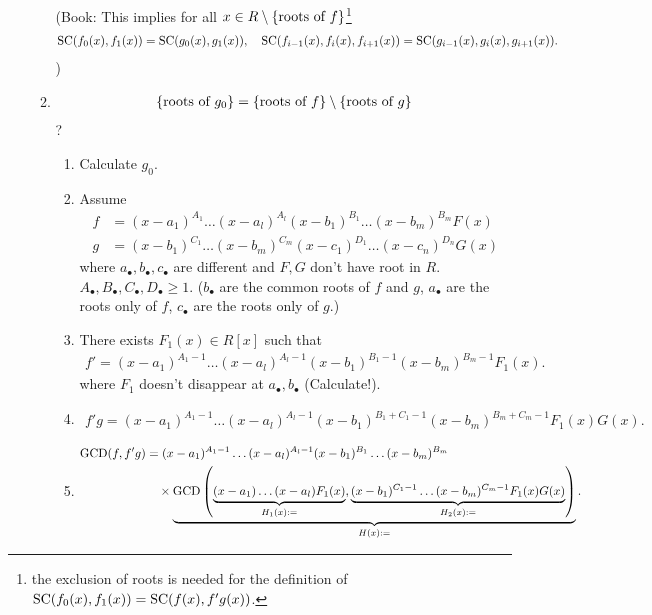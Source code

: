 \documentclass[9pt]{ltjsarticle}
\begin{document}
\begin{itemize}
\begin{enumerate}
    (Book: This implies for all $x\in R\setminus \left\{\text{roots of $f$}\right\}$\footnote{
    the exclusion of roots is needed for the definition of $\mathrm{SC}(f_0(x),f_1(x))=\mathrm{SC}(f(x),f'g(x))$.
    }
    \begin{align}
      \mathrm{SC}(f_0(x),f_1(x)) = \mathrm{SC}(g_0(x),g_1(x)),\quad
      \mathrm{SC}(f_{i-1}(x),f_i(x),f_{i+1}(x)) = \mathrm{SC}(g_{i-1}(x),g_i(x),g_{i+1}(x)).
    \end{align}
    )
    \item
      \begin{align}
        \left\{\text{roots of $g_0$}\right\} = \left\{\text{roots of $f$}\right\} \setminus \left\{\text{roots of $g$}\right\}
      \end{align}
      ?
      \begin{enumerate}
        \item Calculate $g_0$.
        \item
        Assume
        \begin{align}
          f &= (x-a_1)^{A_1} \dots (x-a_l)^{A_l} (x-b_1)^{B_1}\dots (x-b_m)^{B_m} F(x)\\
          g &= (x-b_1)^{C_1}\dots (x-b_m)^{C_m} (x-c_1)^{D_1}\dots (x-c_n)^{D_n} G(x)
        \end{align}
        where $a_\bullet,b_\bullet,c_\bullet$ are different and
        $F,G$ don't have root in $R$.
        $A_\bullet,B_\bullet,C_\bullet,D_\bullet \ge 1$.
        ($b_\bullet$ are the common roots of $f$ and $g$, $a_\bullet$ are the roots only of $f$, $c_\bullet$ are the roots only of $g$.)
        \item There exists $F_1(x) \in R[x]$ such that
        \begin{align}
          f' =
          (x-a_1)^{A_1-1}\dots (x-a_l)^{A_l-1} (x-b_1)^{B_1-1}(x-b_m)^{B_m-1} F_1(x).
        \end{align}
        where $F_1$ doesn't disappear at $a_\bullet,b_\bullet$ (Calculate!).
        \item
        \begin{align}
          f'g =
          (x-a_1)^{A_1-1}\dots (x-a_l)^{A_l-1} (x-b_1)^{B_1 + C_1 - 1}(x-b_m)^{B_m+C_m-1} F_1(x)G(x).
        \end{align}
        \item
        \begin{align}
          \GCD(f,f'g)
          &=
          (x-a_1)^{A_1-1}\dots (x-a_l)^{A_l-1}(x-b_1)^{B_1}\dots (x-b_m)^{B_m}\\
          &\quad \times \ub{\GCD\left( \ub{(x-a_1)\dots (x-a_l) F_1(x)}_{H_1(x)\defeq}, \ub{(x-b_1)^{C_1-1} \dots (x-b_m)^{C_m-1} F_1(x) G(x)}_{H_2(x)\defeq} \right)}_{ H(x) \defeq}.

\end{align}
\end{enumerate}
\end{enumerate}
\end{itemize}
\end{document}

